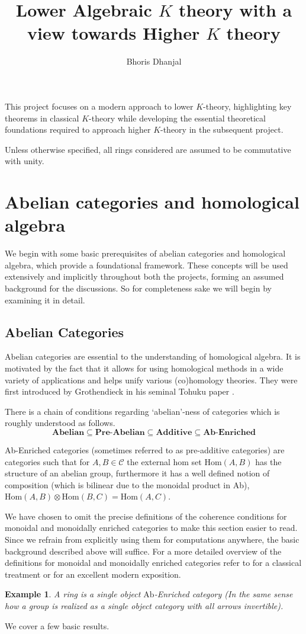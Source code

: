 \documentclass[12pt]{article}
\title{Lower Algebraic $K$ theory with a view towards Higher $K$ theory}
\author{Bhoris Dhanjal}
\numberwithin{equation}{section}
\newcommand{\Hom}{{\mathrm{Hom}}}
\newcounter{dummy} \numberwithin{dummy}{section}
\newtheorem{example}[dummy]{Example}
\begin{document}
	\tableofcontents
	\maketitle
	 This project focuses on a modern approach to lower \( K \)-theory, highlighting key theorems in classical \( K \)-theory while developing the essential theoretical foundations required to approach higher \( K \)-theory in the subsequent project. 
	 
	 Unless otherwise specified, all rings considered are assumed to be commutative with unity.
	 
	\section{Abelian categories and homological algebra}
	
	We begin with some basic prerequisites of abelian categories and homological algebra, which provide a foundational framework. These concepts will be used extensively and implicitly throughout both the projects, forming an assumed background for the discussions. So for completeness sake we will begin by examining it in detail.
	\subsection{Abelian Categories}
	Abelian categories are essential to the understanding of homological algebra. It is motivated by the fact that it allows for using homological methods in a wide variety of applications and helps unify various (co)homology theories. They were first introduced by Grothendieck in his seminal Tohuku paper \cite{grothendieck1957quelques}.
	
	There is a chain of conditions regarding `abelian'-ness of categories which is roughly understood as follows.
	\[ \textbf{Abelian} \subseteq \textbf{Pre-Abelian} \subseteq \textbf{Additive} \subseteq \textbf{Ab-Enriched}\]
	
	Ab-Enriched categories (sometimes referred to as pre-additive categories) are categories such that for $A,B \in \mathcal{C}$ the external hom set $\Hom(A,B)$ has the structure of an abelian group, furthermore it has a well defined notion of composition (which is bilinear due to the monoidal product in Ab), $\Hom(A,B)\otimes \Hom(B,C) =\Hom(A,C)$. 
	
	We have chosen to omit the precise definitions of the coherence conditions for monoidal and monoidally enriched categories to make this section easier to read. Since we refrain from explicitly using them for computations anywhere, the basic background described above will suffice. For a more detailed overview of the definitions for monoidal and monoidally enriched categories refer to \cite{lane1998categories} for a classical treatment or \cite{riehl2017category} for an excellent modern exposition. 
	\begin{example}
		A ring is a single object $\mathrm{Ab}$-Enriched category (In the same sense how a group is realized as a single object category with all arrows invertible).
	\end{example}
	We cover a few basic results.
	
\end{document}
